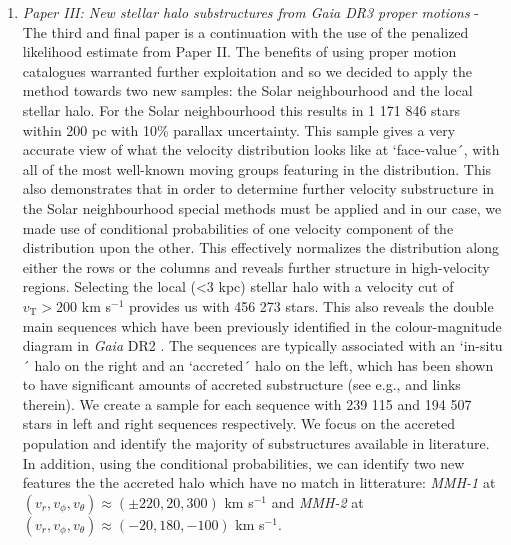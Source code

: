 \begin{enumerate}
    \item \textit{Paper III: New stellar halo substructures from Gaia DR3 proper motions} - The third and final paper is a continuation with the use of the penalized likelihood estimate from Paper II. The benefits of using proper motion catalogues warranted further exploitation and so we decided to apply the method towards two new samples: the Solar neighbourhood and the local stellar halo. For the Solar neighbourhood this results in 1 171 846 stars within 200 pc with 10\% parallax uncertainty. This sample gives a very accurate view of what the velocity distribution looks like at `face-value´, with all of the most well-known moving groups featuring in the distribution. This also demonstrates that in order to determine further velocity substructure in the Solar neighbourhood special methods must be applied and in our case, we made use of conditional probabilities of one velocity component of the distribution upon the other. This effectively normalizes the distribution along either the rows or the columns and reveals further structure in high-velocity regions. Selecting the local (<3 kpc) stellar halo with a velocity cut of $v_\mathrm{T} > 200$ km s$^{-1}$ provides us with 456 273 stars. This also reveals the double main sequences which have been previously identified in the colour-magnitude diagram in \textit{Gaia} DR2 \cite{dr2:hr}. The sequences are typically associated with an `in-situ´ halo on the right and an `accreted´ halo on the left, which has been shown to have significant amounts of accreted substructure (see e.g., \citealt{koppelman:19} and links therein). We create a sample for each sequence with 239 115 and 194 507 stars in left and right sequences respectively. We focus on the accreted population and identify the majority of substructures available in literature. In addition, using the conditional probabilities, we can identify two new features the the accreted halo which have no match in litterature: \textit{MMH-1} at $(v_r, v_\phi, v_\theta) \approx (\pm220, 20, 300)$ km s$^{-1}$ and \textit{MMH-2} at $(v_r, v_\phi, v_\theta) \approx (-20, 180, -100)$ km s$^{-1}$.
\end{enumerate}
